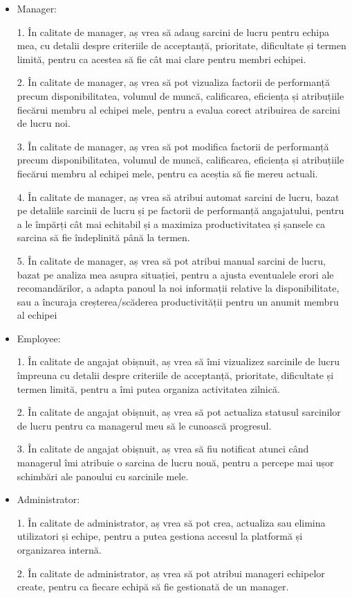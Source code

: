 \begin{itemize}
\item Manager:

1. În calitate de manager, aș vrea să adaug sarcini de lucru pentru echipa mea, cu detalii despre criteriile de acceptanță, prioritate, dificultate și termen limită, pentru ca acestea să fie cât mai clare pentru membri echipei.

2. În calitate de manager, aș vrea să pot vizualiza factorii de performanță precum disponibilitatea, volumul de muncă, calificarea, eficiența și atribuțiile fiecărui membru al echipei mele, pentru a evalua corect atribuirea de sarcini de lucru noi.

3. În calitate de manager, aș vrea să pot modifica factorii de performanță precum disponibilitatea, volumul de muncă, calificarea, eficiența și atribuțiile fiecărui membru al echipei mele, pentru ca aceștia să fie mereu actuali.

4. În calitate de manager, aș vrea să atribui automat sarcini de lucru, bazat pe detaliile sarcinii de lucru și pe factorii de performanță angajatului, pentru a le împărți cât mai echitabil și a maximiza productivitatea și șansele ca sarcina să fie îndeplinită până la
termen.

5. În calitate de manager, aș vrea să pot atribui manual sarcini de lucru, bazat pe analiza mea asupra situației, pentru a ajusta eventualele erori ale recomandărilor, a adapta panoul la noi informații relative la disponibilitate, sau a încuraja creșterea/scăderea productivității pentru un anumit membru al echipei

\item Employee:

1. În calitate de angajat obișnuit, aș vrea să îmi vizualizez sarcinile de lucru împreuna cu detalii despre criteriile de acceptanță, prioritate, dificultate și termen limită, pentru a îmi putea organiza activitatea zilnică.

2. În calitate de angajat obișnuit, aș vrea să pot actualiza statusul sarcinilor de lucru pentru ca managerul meu să le cunoască progresul.

3. În calitate de angajat obișnuit, aș vrea să fiu notificat atunci când managerul îmi atribuie o sarcina de lucru nouă, pentru a percepe mai ușor schimbări ale panoului cu sarcinile mele.

\item Administrator:

1. În calitate de administrator, aș vrea să pot crea, actualiza sau elimina utilizatori și echipe, pentru a putea gestiona accesul la platformă și organizarea internă.

2. În calitate de administrator, aș vrea să pot atribui manageri echipelor create, pentru ca fiecare echipă să fie gestionată de un manager.

\end{itemize}


